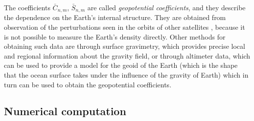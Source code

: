 \documentclass[../main.tex]{subfiles}
\begin{document}
The coefficients $\bar{C}_{n,m}$, $\bar{S}_{n,m}$ are called \emph{geopotential coefficients}, and they describe the dependence on the Earth's internal structure. They are obtained from observation of the perturbations seen in the orbits of other satellites \cite{montenbruck}, because it is not possible to measure the Earth's density directly. Other methods for obtaining such data are through surface gravimetry, which provides precise local and regional information about the gravity field, or through altimeter data, which can be used to provide a model for the geoid of the Earth (which is the shape that the ocean surface takes under the influence of the gravity of Earth) which in turn can be used to obtain the geopotential coefficients.
\subsection{Numerical computation}
\end{document}
